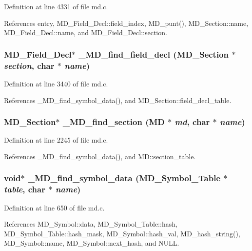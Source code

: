 Definition at line 4331 of file md.c.

References entry, MD\_\-Field\_\-Decl::field\_\-index, MD\_\-punt(), MD\_\-Section::name, MD\_\-Field\_\-Decl::name, and MD\_\-Field\_\-Decl::section.
\subsubsection{\setlength{\rightskip}{0pt plus 5cm}\bf{MD\_\-Field\_\-Decl}$\ast$ \_\-MD\_\-find\_\-field\_\-decl (\bf{MD\_\-Section} $\ast$ {\em section}, char $\ast$ {\em name})}\label{md_8h_121697787a08e7fbea3f858c99f44bb5}




Definition at line 3440 of file md.c.

References \_\-MD\_\-find\_\-symbol\_\-data(), and MD\_\-Section::field\_\-decl\_\-table.
\subsubsection{\setlength{\rightskip}{0pt plus 5cm}\bf{MD\_\-Section}$\ast$ \_\-MD\_\-find\_\-section (\bf{MD} $\ast$ {\em md}, char $\ast$ {\em name})}\label{md_8h_25ff9b27e19281657cfe776a8fea4fcf}




Definition at line 2245 of file md.c.

References \_\-MD\_\-find\_\-symbol\_\-data(), and MD::section\_\-table.
\subsubsection{\setlength{\rightskip}{0pt plus 5cm}void$\ast$ \_\-MD\_\-find\_\-symbol\_\-data (\bf{MD\_\-Symbol\_\-Table} $\ast$ {\em table}, char $\ast$ {\em name})}\label{md_8h_ed3cb8a2f399ad9ce8d7da6df35f8e81}




Definition at line 650 of file md.c.

References MD\_\-Symbol::data, MD\_\-Symbol\_\-Table::hash, MD\_\-Symbol\_\-Table::hash\_\-mask, MD\_\-Symbol::hash\_\-val, MD\_\-hash\_\-string(), MD\_\-Symbol::name, MD\_\-Symbol::next\_\-hash, and NULL.

